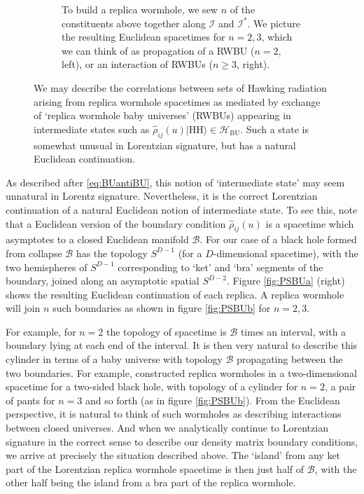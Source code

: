 \documentclass[letterpaper,12pt]{article}
\newcommand*{\hbu}{\mathcal{H}_\text{BU}} %
\newcommand*{\island}{\mathcal{I}}
\newcommand{\HH}{\mathrm{HH}} %
\begin{document}
\begin{figure}[h]
\begin{subfigure}[t]{.9\textwidth}
		\caption{To build a replica wormhole, we sew $n$ of the constituents above together along $\island$ and $\island^*$. We picture the resulting Euclidean spacetimes for $n=2,3$, which we can think of as propagation of a RWBU ($n=2$, left), or an interaction of RWBUs ($n\geq 3$, right).\label{fig:PSBUb}}
\label{fig:PSrho2b}
\end{subfigure}
\caption{We may describe the correlations between sets of Hawking radiation arising from replica wormhole spacetimes as mediated by exchange of `replica wormhole baby universes' (RWBUs) appearing in intermediate states such as $\hat{\rho}_{ij}(u)|\HH\rangle\in\hbu$. Such a state is somewhat unusual in Lorentzian signature, but has a natural Euclidean continuation.\label{fig:PSBU}}
\end{figure}

As described after \eqref{eq:BUantiBU}, this notion of `intermediate state' may seem unnatural in Lorentz signature.  Nevertheless, it is the correct Lorentzian continuation of a natural Euclidean notion of intermediate state.  To see this, note that a Euclidean version of the boundary condition $\hat{\rho}_{ij}(u)$ is a spacetime which asymptotes to a closed Euclidean manifold $\mathcal{B}$. For our case of a black hole formed from collapse $\mathcal{B}$ has the topology $S^{D-1}$ (for a $D$-dimensional spacetime), with the two hemispheres of $S^{D-1}$ corresponding to `ket' and `bra' segments of the boundary, joined along an asymptotic spatial $S^{D-2}$. Figure \ref{fig:PSBUa} (right) shows the resulting Euclidean continuation of each replica. A replica wormhole will join $n$ such boundaries as shown in figure \ref{fig:PSBUb} for $n=2,3$.


For example, for $n=2$ the topology of spacetime is $\mathcal{B}$ times an interval, with a boundary lying at each end of the interval. It is then very natural to describe this cylinder in terms of a baby universe with topology $\mathcal{B}$ propagating between the two boundaries. For example, \cite{Almheiri:2019qdq} constructed replica wormholes in a two-dimensional spacetime for a two-sided black hole, with topology of a cylinder for $n=2$, a pair of pants for $n=3$ and so forth (as in figure \ref{fig:PSBUb}). From the Euclidean perspective, it is natural to think of such wormholes as describing interactions between closed universes. And when we analytically continue to Lorentzian signature in the correct sense to describe our density matrix boundary conditions, we arrive at precisely the situation described above. The  `island'  from any ket part of the Lorentzian replica wormhole spacetime is then just half of $\mathcal{B}$, with the other half being the island from a bra part of the replica wormhole.
\end{document}
